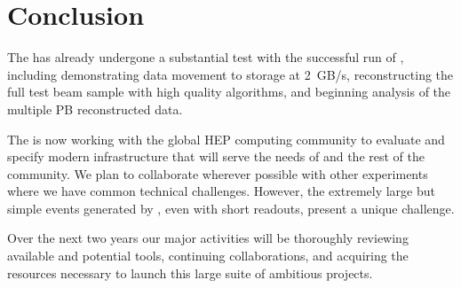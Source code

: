 \section{Conclusion}

The   has already undergone a substantial test with the successful run of , including demonstrating data movement to storage at \SI{2}{GB/s}, reconstructing the full test beam sample with high quality algorithms, and beginning analysis of the multiple PB reconstructed data. 

The  is now working with the global HEP computing community to evaluate and specify modern infrastructure that will serve the needs of  and the rest of the community.  We plan to collaborate wherever possible with other experiments where we have common technical challenges. However, the extremely large but simple events generated by  , even with short readouts, present a unique challenge. 

Over the next two years our major activities  will be  thoroughly reviewing available and potential tools, continuing collaborations, and acquiring the resources necessary to launch this large suite of ambitious projects. 
